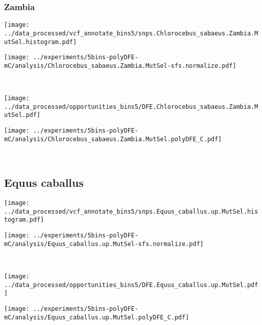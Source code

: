 \subsubsection{Zambia}

\begin{minipage}{0.49\linewidth}
    \texttt{[image: ../data\_processed/vcf\_annotate\_bins5/snps.Chlorocebus\_sabaeus.Zambia.MutSel.histogram.pdf]}
\end{minipage}
\begin{minipage}{0.49\linewidth}
    \texttt{[image: ../experiments/5bins-polyDFE-mC/analysis/Chlorocebus\_sabaeus.Zambia.MutSel-sfs.normalize.pdf]}
\end{minipage}
\\
\begin{minipage}{0.49\linewidth}
    \texttt{[image: ../data\_processed/opportunities\_bins5/DFE.Chlorocebus\_sabaeus.Zambia.MutSel.pdf]}
\end{minipage}
\begin{minipage}{0.49\linewidth}
    \texttt{[image: ../experiments/5bins-polyDFE-mC/analysis/Chlorocebus\_sabaeus.Zambia.MutSel.polyDFE\_C.pdf]}
\end{minipage}
\\

\subsection{Equus caballus}

\begin{minipage}{0.49\linewidth}
    \texttt{[image: ../data\_processed/vcf\_annotate\_bins5/snps.Equus\_caballus.up.MutSel.histogram.pdf]}
\end{minipage}
\begin{minipage}{0.49\linewidth}
    \texttt{[image: ../experiments/5bins-polyDFE-mC/analysis/Equus\_caballus.up.MutSel-sfs.normalize.pdf]}
\end{minipage}
\\
\begin{minipage}{0.49\linewidth}
    \texttt{[image: ../data\_processed/opportunities\_bins5/DFE.Equus\_caballus.up.MutSel.pdf]}
\end{minipage}
\begin{minipage}{0.49\linewidth}
    \texttt{[image: ../experiments/5bins-polyDFE-mC/analysis/Equus\_caballus.up.MutSel.polyDFE\_C.pdf]}
\end{minipage}
\\


